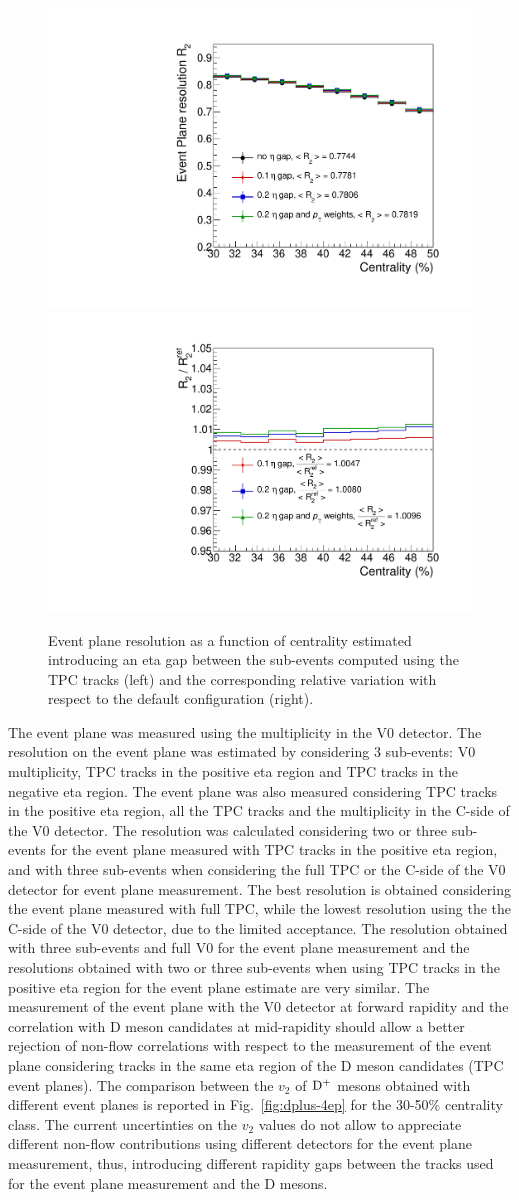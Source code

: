 \begin{figure}
\centering
  \includegraphics[width=.45\textwidth]{FigCap5/EPresolution_VZERO_NonFlowSyst.pdf}
  \includegraphics[width=.45\textwidth]{FigCap5/EPresolution_VZERO_NonFlowSyst_ratio.pdf}
\caption{Event plane resolution as a function of centrality estimated introducing an eta gap between the sub-events computed using the TPC tracks (left) and the corresponding relative variation with respect to the default configuration (right).}
\label{fig:EtaGapSyst}
\end{figure}

The event plane was measured using the multiplicity in the V0
detector. The resolution on the event plane was estimated by considering 3
sub-events: V0 multiplicity, TPC tracks in the positive eta region
and TPC tracks in the negative eta region. The event plane was also
measured considering TPC tracks in the positive eta region, all the
TPC tracks and the multiplicity in the C-side of the V0
detector. The resolution was calculated considering two or three
sub-events for the event plane measured with TPC tracks in the
positive eta region, and with three sub-events when considering the
full TPC or the C-side of the V0 detector for event plane
measurement. The best resolution is obtained considering the event
plane measured with full TPC, while the lowest resolution using the
the C-side of the V0 detector, due to the limited acceptance. The
resolution obtained with three sub-events and full V0 for the event
plane measurement and the resolutions obtained with two or three
sub-events when using TPC tracks in the positive eta region for the
event plane estimate are very similar. The
measurement of the event plane with the V0 detector at forward
rapidity and the correlation with D meson candidates at mid-rapidity
should allow a better rejection of non-flow correlations with respect
to the measurement of the event plane considering tracks in the same
eta region of the D meson candidates (TPC event planes).
The comparison between the $v_2$ of ${\rm D^+}$ mesons obtained with 
different event planes is reported in 
Fig.~\ref{fig:dplus-4ep} for the 30-50\% centrality class. 
The current uncertinties on the $v_2$ values do not allow to
appreciate different non-flow contributions using different detectors
for the event plane measurement, thus, introducing different
rapidity gaps between the tracks used for the event plane measurement
and the D mesons.

